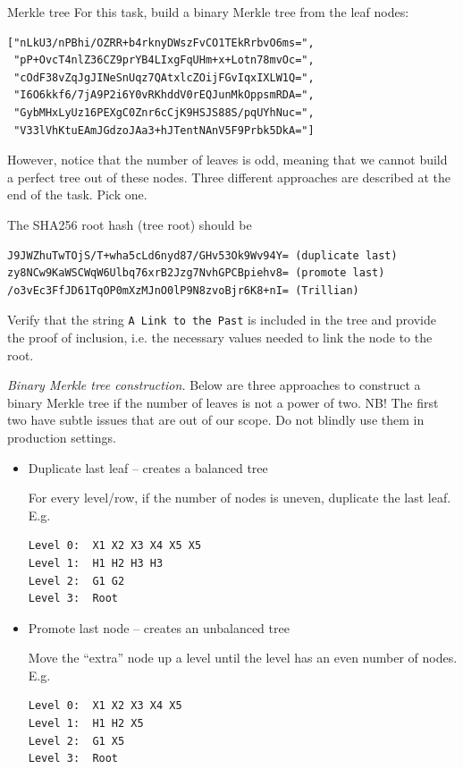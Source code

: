 \documentclass{practice}
\begin{document}
\begin{task}{Merkle tree}
  For this task, build a binary Merkle tree from the leaf nodes:
  \begin{Verbatim}
["nLkU3/nPBhi/OZRR+b4rknyDWszFvCO1TEkRrbvO6ms=",
 "pP+OvcT4nlZ36CZ9prYB4LIxgFqUHm+x+Lotn78mvOc=",
 "cOdF38vZqJgJINeSnUqz7QAtxlcZOijFGvIqxIXLW1Q=",
 "I6O6kkf6/7jA9P2i6Y0vRKhddV0rEQJunMkOppsmRDA=",
 "GybMHxLyUz16PEXgC0Znr6cCjK9HSJS88S/pqUYhNuc=",
 "V33lVhKtuEAmJGdzoJAa3+hJTentNAnV5F9Prbk5DkA="]
  \end{Verbatim}

  However, notice that the number of leaves is odd, meaning that we cannot build a perfect tree out of these nodes.
  Three different approaches are described at the end of the task.
  Pick one.

  The SHA256 root hash (tree root) should be
  \begin{Verbatim}
J9JWZhuTwTOjS/T+wha5cLd6nyd87/GHv53Ok9Wv94Y= (duplicate last)
zy8NCw9KaWSCWqW6Ulbq76xrB2Jzg7NvhGPCBpiehv8= (promote last)
/o3vEc3FfJD61TqOP0mXzMJnO0lP9N8zvoBjr6K8+nI= (Trillian)
  \end{Verbatim}

  Verify that the string \texttt{A Link to the Past} is included in the tree and provide the proof of inclusion, i.e. the necessary values needed to link the node to the root.

  \textit{Binary Merkle tree construction.}
  Below are three approaches to construct a binary Merkle tree if the number of leaves is not a power of two.
  NB! The first two have subtle issues that are out of our scope.
  Do not blindly use them in production settings.

  \begin{itemize}
    \item Duplicate last leaf -- creates a balanced tree
    
    For every level/row, if the number of nodes is uneven, duplicate the last leaf. E.g.
    \begin{Verbatim}
Level 0:  X1 X2 X3 X4 X5 X5
Level 1:  H1 H2 H3 H3
Level 2:  G1 G2
Level 3:  Root
    \end{Verbatim}
    \item Promote last node -- creates an unbalanced tree
    
    Move the \enquote{extra} node up a level until the level has an even number of nodes. E.g.
    \begin{Verbatim}
Level 0:  X1 X2 X3 X4 X5
Level 1:  H1 H2 X5
Level 2:  G1 X5
Level 3:  Root
    \end{Verbatim}


\end{itemize}
\end{task}
\end{document}

